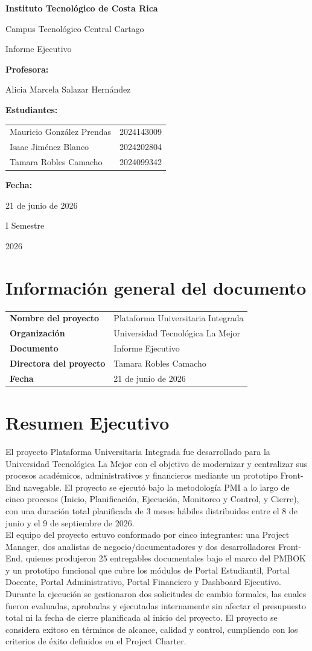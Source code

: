 \documentclass[11pt,spanish]{article}
\title{\DocumentoTitulo}
\author{\AutoresPortada}
\date{\FechaDocumento}
\makeatletter
\newcommand{\Institucion}{Instituto Tecnológico de Costa Rica}
\newcommand{\Campus}{Campus Tecnológico Central Cartago}
\newcommand{\DocumentoTitulo}{Informe Ejecutivo}
\newcommand{\Profesor}{Alicia Marcela Salazar Hernández}
\newcommand{\FechaDocumento}{21 de junio de 2026}
\newcommand{\PeriodoAcademico}{I Semestre}
\newcommand{\AnioDocumento}{2026}
\newcommand{\AutoresPortada}{%
    \begin{tabular}{l@{\hspace{1.5cm}}r}
        Mauricio González Prendas & 2024143009\\
        Isaac Jiménez Blanco & 2024202804\\
        Tamara Robles Camacho & 2024099342
    \end{tabular}%
}
\newcommand{\MakeCover}{%
\begin{titlepage}
\thispagestyle{empty}
\centering

{\bfseries \huge \Institucion \par}
\vspace{0.25cm}
{\LARGE \Campus \par}

\vfill

{\huge \DocumentoTitulo \par}


\vfill

{\bfseries \LARGE Profesora: \par}
{\Large \Profesor \par}

\vfill

{\bfseries \LARGE Estudiantes: \par}
{\Large \AutoresPortada \par}

\vfill

{\bfseries\LARGE Fecha: \par}
{\Large \FechaDocumento \par}

\vfill

{\LARGE \PeriodoAcademico \par}
{\LARGE \AnioDocumento \par}

\end{titlepage}%
}
\makeatother
\begin{document}
\hypersetup{pageanchor=false}

\MakeCover

\pagestyle{empty}
\tableofcontents
\clearpage
{}
\hypersetup{pageanchor=true}
\pagestyle{fancy}

\section{Información general del documento}

\begin{table}[H]
\centering
\begin{tabularx}{\textwidth}{p{5cm} Y}
\toprule
\textbf{Nombre del proyecto} & Plataforma Universitaria Integrada \\
\textbf{Organización} & Universidad Tecnológica La Mejor \\
\textbf{Documento} & \DocumentoTitulo \\
\textbf{Directora del proyecto} & Tamara Robles Camacho \\
\textbf{Fecha} & \FechaDocumento \\
\bottomrule
\end{tabularx}
\end{table}



\section{Resumen Ejecutivo}
El proyecto Plataforma Universitaria Integrada fue desarrollado para la Universidad Tecnológica La Mejor con el objetivo de modernizar y centralizar sus procesos académicos, administrativos y financieros mediante un prototipo Front-End navegable. El proyecto se ejecutó bajo la metodología PMI a lo largo de cinco procesos (Inicio, Planificación, Ejecución, Monitoreo y Control, y Cierre), con una duración total planificada de 3 meses hábiles distribuidos entre el 8 de junio y el 9 de septiembre de 2026.\\
El equipo del proyecto estuvo conformado por cinco integrantes: una Project Manager, dos analistas de negocio/documentadores y dos desarrolladores Front-End, quienes produjeron 25 entregables documentales bajo el marco del PMBOK y un prototipo funcional que cubre los módulos de Portal Estudiantil, Portal Docente, Portal Administrativo, Portal Financiero y Dashboard Ejecutivo.\\
Durante la ejecución se gestionaron dos solicitudes de cambio formales, las cuales fueron evaluadas, aprobadas y ejecutadas internamente sin afectar el presupuesto total ni la fecha de cierre planificada al inicio del proyecto. El proyecto se considera exitoso en términos de alcance, calidad y control, cumpliendo con los criterios de éxito definidos en el Project Charter.
\end{document}
